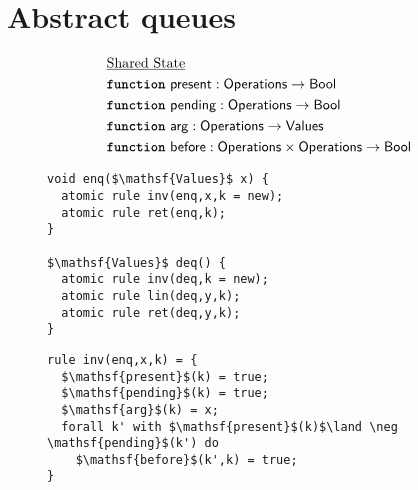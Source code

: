 \section{Abstract queues}


\begin{figure}[t]
\hspace{-8mm}
\begin{minipage}[t]{7.5cm}
\scriptsize{
{	%
	\begin{align*}
		& \text{\underline{Shared State}} \\
		& \text{{\ttfamily \bfseries function}}\ \mathsf{present} : \mathsf{Operations} \rightarrow \mathsf{Bool} \\
		& \text{{\ttfamily \bfseries function}}\ \mathsf{pending} : \mathsf{Operations} \rightarrow \mathsf{Bool} \\
		& \text{{\ttfamily \bfseries function}}\ \mathsf{arg} : \mathsf{Operations} \rightarrow \mathsf{Values} \\
		& \text{{\ttfamily \bfseries function}}\ \mathsf{before} : \mathsf{Operations} \times \mathsf{Operations} \rightarrow \mathsf{Bool} \\
	\end{align*}
}}
\end{minipage}
\begin{minipage}[t]{7.5cm}
\begin{lstlisting}
void enq($\mathsf{Values}$ x) {
  atomic rule inv(enq,x,k = new);
  atomic rule ret(enq,k);
}

$\mathsf{Values}$ deq() {
  atomic rule inv(deq,k = new);
  atomic rule lin(deq,y,k);
  atomic rule ret(deq,y,k);
}
\end{lstlisting}
\end{minipage}

\begin{minipage}[t]{7.5cm}
\begin{lstlisting}
rule inv(enq,x,k) = {
  $\mathsf{present}$(k) = true;
  $\mathsf{pending}$(k) = true;
  $\mathsf{arg}$(k) = x;
  forall k' with $\mathsf{present}$(k)$\land \neg \mathsf{pending}$(k') do
    $\mathsf{before}$(k',k) = true;
}


\end{lstlisting}
\end{minipage}
\end{figure}
